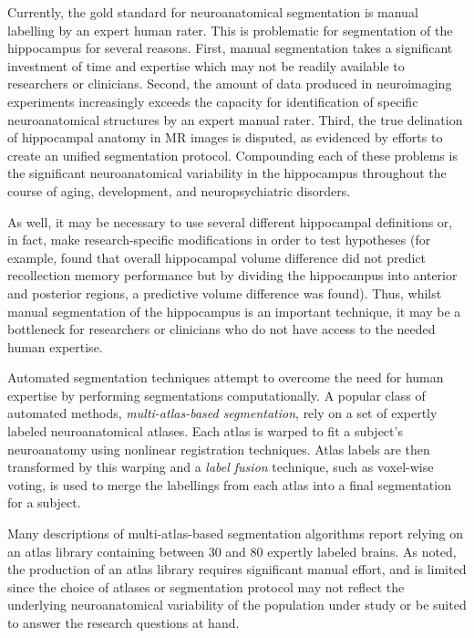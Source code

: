 \documentclass{article}
\begin{document}
Currently, the gold standard for neuroanatomical segmentation is manual
labelling by an expert human rater.  This is problematic for segmentation of
the hippocampus for several reasons.  First, manual segmentation takes a
significant investment of time and expertise \cite{Hammers2003} which may not
be readily available to researchers or clinicians.  Second, the amount of data
produced in neuroimaging experiments increasingly exceeds the capacity for
identification of specific neuroanatomical structures by an expert manual
rater.  Third, the true delination of hippocampal anatomy in MR images is
disputed\cite{Geuze2004}, as evidenced by efforts to create an unified
segmentation protocol\cite{Jack2011}.  Compounding each of these problems
is the significant neuroanatomical variability in the hippocampus
throughout the course of aging, development, and neuropsychiatric
disorders\cite{someone}.

As well, it may be necessary to use several different hippocampal
definitions or, in fact, make research-specific modifications in order to test
hypotheses (for example, \cite{Poppenk2011} found that overall hippocampal
volume difference did not predict recollection memory performance but by
dividing the hippocampus into anterior and posterior regions, a predictive
volume difference was found).  Thus, whilst manual segmentation of the
hippocampus is an important technique, it may be a bottleneck for researchers
or clinicians who do not have access to the needed human expertise.

Automated segmentation techniques attempt to overcome the need for human
expertise by performing segmentations computationally.  A popular class of
automated methods, {\it multi-atlas-based segmentation}, rely on a set of
expertly labeled neuroanatomical atlases. Each atlas is warped to fit a
subject's neuroanatomy using nonlinear registration
techniques\cite{Collins1995,Klein2009}.  Atlas labels are then transformed
by this warping and a {\it label fusion} technique, such as voxel-wise
voting, is used to merge the labellings from each atlas into a final
segmentation for a subject.  

Many descriptions of multi-atlas-based segmentation algorithms report relying on an
atlas library containing between 30 and 80 expertly labeled
brains\cite{Heckemann2011,Collins2010,Aljabar2009,Leung2010,Lotjonen2010}.
As noted, the production of an atlas library requires significant manual
effort, and is limited since the choice of atlases or segmentation protocol may
not reflect the underlying neuroanatomical variability of the population under
study or be suited to answer the research questions at hand.
\end{document}
